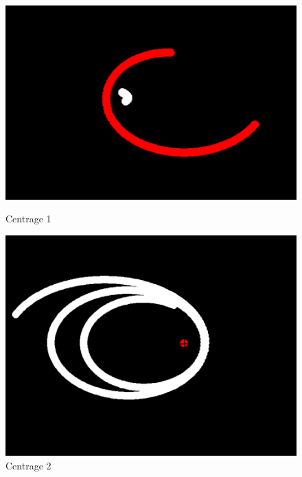 \documentclass[a4paper, 12pt]{article}
\begin{document}
	\begin{figure}[H]
    	\centering
    	\begin{minipage}{0.25\linewidth}
        	\centering
        	\includegraphics[width=\linewidth]{img/centrage1.png}
        	\caption{\label{fig:centrage1} Centrage 1}
    	\end{minipage}
    	\hspace{0.05\linewidth}  %
    	\begin{minipage}{0.25\linewidth}
        	\centering
        	\includegraphics[width=\linewidth]{img/centrage2.png}
        	\caption{\label{fig:centrage2} Centrage 2} 
    	\end{minipage}
	\end{figure} 
\end{document}
